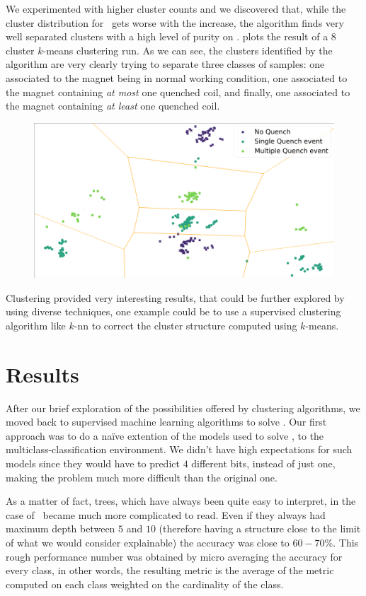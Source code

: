 We experimented with higher cluster counts and we discovered that, while the cluster distribution
for \cnmod\ gets worse with the increase, the algorithm finds very well separated clusters with a
high level of purity on \an.  plots the result of a $8$ cluster $k$-means clustering run. As we can see,
the clusters identified by the algorithm are very clearly trying to separate three classes of
samples: one associated to the magnet being in normal working condition, one associated to the
magnet containing \emph{at most} one quenched coil, and finally, one associated to the magnet
containing \emph{at least} one quenched coil.
\begin{figure}[!ht]
	\centering
	\includegraphics[width=0.8\linewidth]{img/clustering_an_qlp_8c.png}
	\caption{}\label{fig:clustering-an}
\end{figure}
Clustering provided very interesting results, that could be further explored by using diverse
techniques, one example could be to use a supervised clustering algorithm like $k$-nn to correct the
cluster structure computed using $k$-means.

\section{Results}
After our brief exploration of the possibilities offered by clustering algorithms, we moved back to
supervised machine learning algorithms to solve \qlp. Our first approach was to do a na\"ive
extention of the models used to solve \qrp, to the multiclass-classification environment. We didn't
have high expectations for such models since they would have to predict $4$ different bits, instead of just one, making the problem
much more difficult than the original one.

As a matter of fact, trees, which have always been quite easy to interpret, in the case of \qlp\
became much more complicated to read. Even if they always had maximum depth between $5$ and $10$
(therefore having a structure close to the limit of what we would consider explainable) the accuracy
was close to $60 - 70\%$. This rough performance number was obtained by micro averaging the accuracy
for every class, in other words, the resulting metric is the average of the metric computed on each
class weighted on the cardinality of the class.

